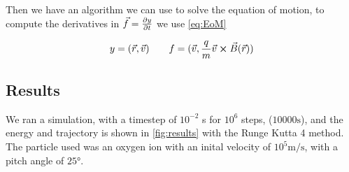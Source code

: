 \documentclass[x11names]{article}
\renewcommand{\va}{\vec}
\begin{document}
    Then we have an algorithm we can use to solve the equation of motion, to compute the derivatives in \(\va{f} = \pdv{y}{t}\) we use \cref{eq:EoM} 

    \begin{align}
      y = ( \va{r}, \va{v} )
      \qquad
      f = ( \va{v}, \frac{q}{m} \va{ v }\cross \va{B}(\va{r})  )
    \end{align}


\subsection{Results}
    
    We ran a simulation, with a timestep of \(10^{-2}\) s for \(10^6\) steps, (\(10000 \si{\second}\)), and the energy and trajectory is shown in \cref{fig:results} with the Runge Kutta 4 method. The particle used was an oxygen ion with an inital velocity of \(10^5 \si{\meter\per\second}\), with a pitch angle of \(25\si{\degree}\). 
\end{document}
